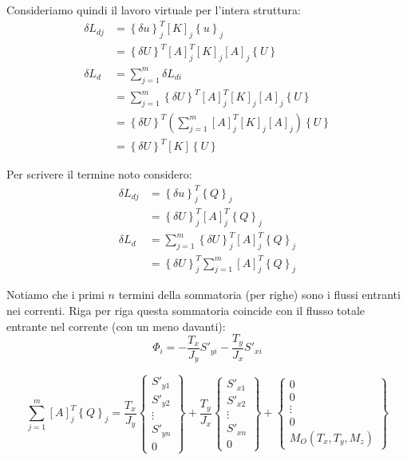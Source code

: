 Consideriamo quindi il lavoro virtuale per l'intera struttura:
\begin{align*}
 \delta L_{dj}  &=\left\{\delta u\right\}_j^T  [K]_j  \left\{u\right\}_j\\
 &=\left\{\delta U\right\}^T [A]_j^T [K]_j  [A]_j\left\{U\right\}\\
    \delta L_d  &= \sum_{j=1}^m \delta L_{di} \\
        &= \sum_{j=1}^m\left\{\delta U\right\}^T [A]_j^T [K]_j  [A]_j\left\{U\right\} \\
        &=\left\{\delta U\right\}^T   \left( \sum_{j=1}^m    [A]_j^T [K]_j  [A]_j    \right)\left\{U\right\}\\
        &=\left\{\delta U\right\}^T    [K]\left\{U\right\}
\end{align*}

Per scrivere il termine noto considero:
\begin{align*}
 \delta L_{dj}  &=\left\{\delta u\right\}_j^T   \left\{Q\right\}_j\\
 &=\left\{\delta U\right\}_j^T [A]_j^T\left\{Q\right\}_j\\
    \delta L_d  &= \sum_{j=1}^m  \left\{\delta U\right\}_j^T [A]_j^T\left\{Q\right\}_j \\
        &=  \left\{\delta U\right\}_j^T \sum_{j=1}^m [A]_j^T\left\{Q\right\}_j
\end{align*}

Notiamo che i primi $n$ termini della sommatoria (per righe) sono i flussi entranti nei correnti. Riga per riga questa sommatoria coincide con il flusso totale entrante nel corrente (con un meno davanti):
\begin{equation*}
    \Phi_i=-\frac{T_x}{J_y}S'_{yi} - \frac{T_y}{J_x}S'_{xi}
\end{equation*}

\begin{equation*}
    \sum_{j=1}^m [A]_j^T\left\{Q\right\}_j =
    \frac{T_x}{J_y}\left\{
    \begin{array}{c}
    S'_{y1} \\
    S'_{y2} \\
    \vdots \\
    S'_{yn}\\0
    \end{array}
    \right\}
    + \frac{T_y}{J_x}\left\{
    \begin{array}{c}
    S'_{x1} \\
    S'_{x2} \\
    \vdots \\
    S'_{xn}\\0
    \end{array}
    \right\}
    +\left\{
    \begin{array}{c}
    0 \\
    0 \\
    \vdots \\0\\
    M_O(T_x,T_y,M_z)
    \end{array}
    \right\}
\end{equation*}

